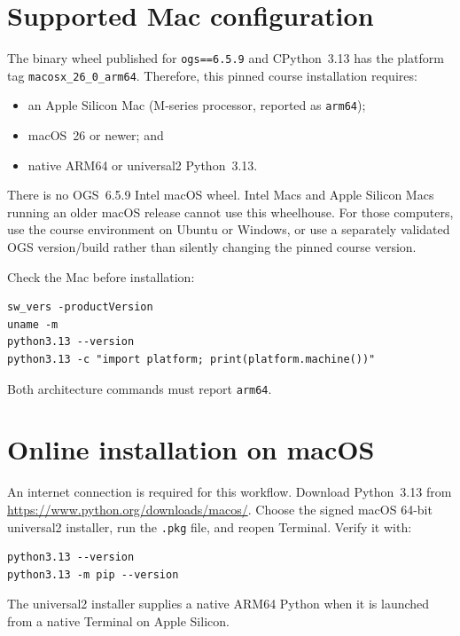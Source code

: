 \documentclass[11pt,a4paper]{tubaf-report}
\begin{document}
\section{Supported Mac configuration}

The binary wheel published for \texttt{ogs==6.5.9} and CPython~3.13 has the
platform tag \texttt{macosx\_26\_0\_arm64}. Therefore, this pinned course
installation requires:

\begin{itemize}
    \item an Apple Silicon Mac (M-series processor, reported as
          \texttt{arm64});
    \item macOS~26 or newer; and
    \item native ARM64 or universal2 Python~3.13.
\end{itemize}

There is no OGS~6.5.9 Intel macOS wheel. Intel Macs and Apple Silicon Macs
running an older macOS release cannot use this wheelhouse. For those computers,
use the course environment on Ubuntu or Windows, or use a separately validated
OGS version/build rather than silently changing the pinned course version.

Check the Mac before installation:

\begin{lstlisting}[style=terminal]
sw_vers -productVersion
uname -m
python3.13 --version
python3.13 -c "import platform; print(platform.machine())"
\end{lstlisting}

Both architecture commands must report \texttt{arm64}.

\section{Online installation on macOS}

An internet connection is required for this workflow. Download Python~3.13 from
\url{https://www.python.org/downloads/macos/}. Choose the signed macOS 64-bit
universal2 installer, run the \texttt{.pkg} file, and reopen Terminal. Verify it
with:

\begin{lstlisting}[style=terminal]
python3.13 --version
python3.13 -m pip --version
\end{lstlisting}

The universal2 installer supplies a native ARM64 Python when it is launched from
a native Terminal on Apple Silicon.
\end{document}
